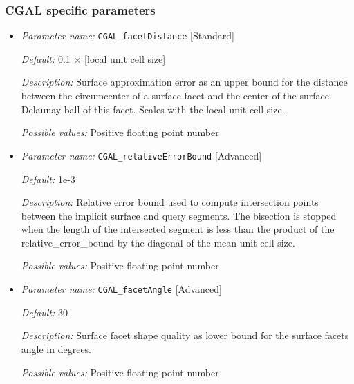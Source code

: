 \subsubsection{CGAL specific parameters} \label{parameters:cgal}
\begin{itemize}[itemsep=0.8em, parsep=0.3em]
	\item {\it Parameter name:} {\tt CGAL\_facetDistance} \hfill [Standard]
	\label{parameters:me_facetDistance}
	
	
	{\it Default:} 0.1 $\times$ [local unit cell size]
	
	{\it Description:} Surface approximation error as an upper bound for the distance between the circumcenter of a surface facet and the center of the surface Delaunay ball of this facet. Scales with the local unit cell size.
	
	{\it Possible values:} Positive floating point number 
	
	\item {\it Parameter name:} {\tt CGAL\_relativeErrorBound} \hfill [Advanced]
	\label{parameters:me_relativeErrorBound}
	
	
	{\it Default:} 1e-3
	
	{\it Description:} Relative error bound used to compute intersection points between the implicit surface and query segments. The bisection is stopped when the length of the intersected segment is less than the product of the relative\_error\_bound by the diagonal of the mean unit cell size.
	
	{\it Possible values:} Positive floating point number

	\item {\it Parameter name:} {\tt CGAL\_facetAngle} \hfill [Advanced]
	\label{parameters:me_facetAngle}
	
	
	{\it Default:} 30
	
	{\it Description:} Surface facet shape quality as lower bound for the surface facets angle in degrees.
	
	{\it Possible values:} Positive floating point number
	

\end{itemize}
